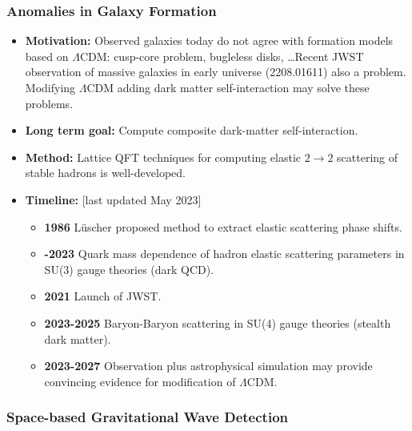 \documentclass[12pt,hyperpdf]{article}
\begin{document}
\subsubsection{Anomalies in Galaxy Formation}

\begin{itemize}
   \item{ \bf Motivation:} Observed galaxies today do not agree with formation models based on $\Lambda$CDM: cusp-core problem, bugleless disks, \dots Recent JWST observation of massive galaxies in early universe (2208.01611) also a problem.  Modifying $\Lambda$CDM adding dark matter self-interaction may solve these problems.
   \item {\bf Long term goal:} Compute composite dark-matter self-interaction.
   \item{ \bf Method:} Lattice QFT techniques for computing elastic $2 \to 2$ scattering of stable hadrons is well-developed.
\item{\bf Timeline:} \hfill [last updated May 2023]
\begin{itemize}
   \item {\bf 1986} L\"uscher proposed method to extract elastic scattering phase shifts.
    \item {\bf -2023} Quark mass dependence of hadron elastic scattering parameters in SU(3) gauge theories (dark QCD).
   \item{\bf 2021} Launch of JWST. 
   \item {\bf 2023-2025} Baryon-Baryon scattering in SU(4) gauge theories (stealth dark matter).
   \item {\bf 2023-2027} Observation plus astrophysical simulation may provide convincing evidence for modification of $\Lambda$CDM.
\end{itemize}
\end{itemize}

\subsubsection{Space-based Gravitational Wave Detection}
\end{document}
